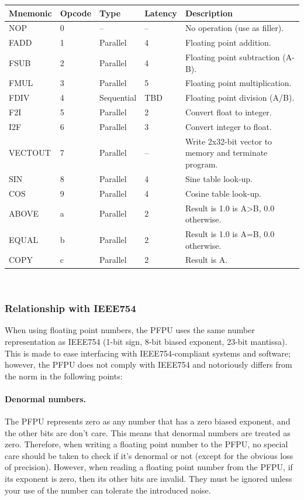 \documentclass[a4paper,11pt]{article}
\begin{document}
\begin{tabularx}{\textwidth}{|l|l|l|l|X|}
\hline
\bf Mnemonic & \bf Opcode & \bf Type & \bf Latency & \bf Description \\
\hline
NOP & 0 & -- & -- & No operation (use as filler). \\
\hline
FADD & 1 & Parallel & 4 & Floating point addition. \\
\hline
FSUB & 2 & Parallel & 4 & Floating point subtraction (A-B). \\
\hline
FMUL & 3 & Parallel & 5 & Floating point multiplication. \\
\hline
FDIV & 4 & Sequential & TBD & Floating point division (A/B). \\
\hline
F2I & 5 & Parallel & 2 & Convert float to integer. \\
\hline
I2F & 6 & Parallel & 3 & Convert integer to float. \\
\hline
VECTOUT & 7 & Parallel & -- & Write 2x32-bit vector to memory and terminate program. \\
\hline
SIN & 8 & Parallel & 4 & Sine table look-up. \\
\hline
COS & 9 & Parallel & 4 & Cosine table look-up. \\
\hline
ABOVE & a & Parallel & 2 & Result is 1.0 is A>B, 0.0 otherwise. \\
\hline
EQUAL & b & Parallel & 2 & Result is 1.0 is A=B, 0.0 otherwise. \\
\hline
COPY & c & Parallel & 2 & Result is A. \\
\hline
\end{tabularx}\\

\subsubsection{Relationship with IEEE754}
When using floating point numbers, the PFPU uses the same number representation as IEEE754 (1-bit sign, 8-bit biased exponent, 23-bit mantissa). This is made to ease interfacing with IEEE754-compliant systems and software; however, the PFPU does not comply with IEEE754 and notoriously differs from the norm in the following points:

\paragraph{Denormal numbers.} The PFPU represents zero as any number that has a zero biased exponent, and the other bits are don't care. This means that denormal numbers are treated as zero. Therefore, when writing a floating point number to the PFPU, no special care should be taken to check if it's denormal or not (except for the obvious loss of precision). However, when reading a floating point number from the PFPU, if its exponent is zero, then its other bits are invalid. They must be ignored unless your use of the number can tolerate the introduced noise.
\end{document}
